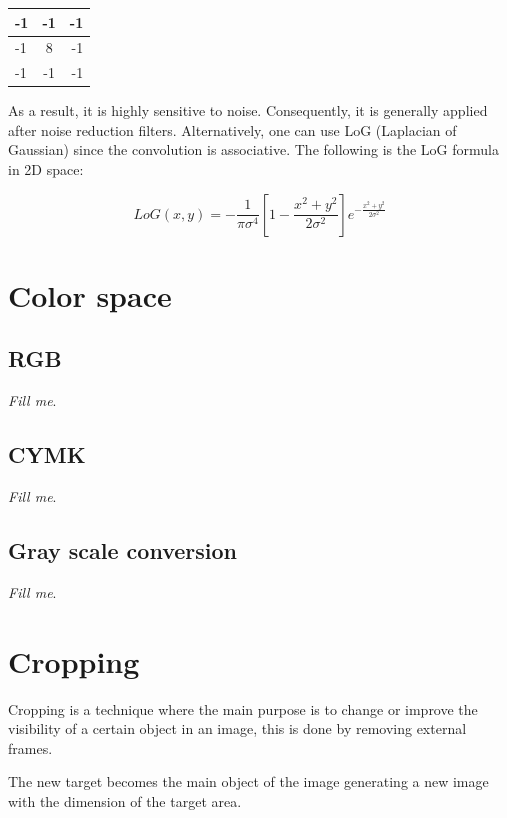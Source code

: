 \documentclass{article}
\begin{document}
	\begin{center}
  \begin{tabular}{ | l | c | r | }
    \hline
    -1 & -1 & -1 \\ \hline
    -1 & 8 & -1 \\ \hline
    -1 & -1 & -1 \\
    \hline
  \end{tabular}
\end{center}


			 As a result, it is highly sensitive to noise. Consequently,
			it is generally applied after noise reduction filters. Alternatively, one can use LoG (Laplacian of Gaussian) since the convolution is
			associative. The following is the LoG formula in 2D space:

			\[LoG(x,y) = -\frac{1}{\pi\sigma^{4}}[1-\frac{x^{2}+y^{2}}{2\sigma^{2}}]e^{-\frac{x^{2}+y^{2}}{2\sigma^{2}}}\]

			

\section{Color space}          

	\subsection{RGB}
		
		\textit{Fill me}.

	\subsection{CYMK}

		\textit{Fill me}.

	\subsection{Gray scale conversion}

		\textit{Fill me}.

\section{Cropping}

	Cropping is a technique where the main purpose is to change or improve the visibility of a certain object in an image, 
	this is done by removing external frames. 

	The new target becomes the main object of the image generating a new image with the dimension of the target area.  
\end{document}
